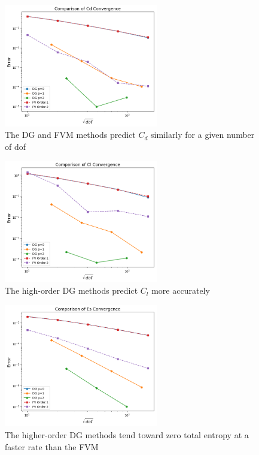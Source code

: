 \documentclass{article}
\begin{document}
\begin{figure}[H]
	\centering
	\includegraphics[width=0.60\textwidth,keepaspectratio]{comp_cd.png}
	\caption{The DG and FVM methods predict $C_d$ similarly for a given number of dof}
\label{fig:comp_cl}
\end{figure}
\begin{figure}[H]
\centering
\includegraphics[width=0.60\textwidth,keepaspectratio]{comp_cl.png}
\caption{The high-order DG methods predict $C_l$ more accurately}
\label{fig:comp_cd}
\end{figure}
\begin{figure}[H]
\centering
\includegraphics[width=0.60\textwidth,keepaspectratio]{comp_Es.png}
\caption{The higher-order DG methods tend toward zero total entropy at a faster rate than the FVM}
\label{fig:comp_Es}
\end{figure}
\end{document}
